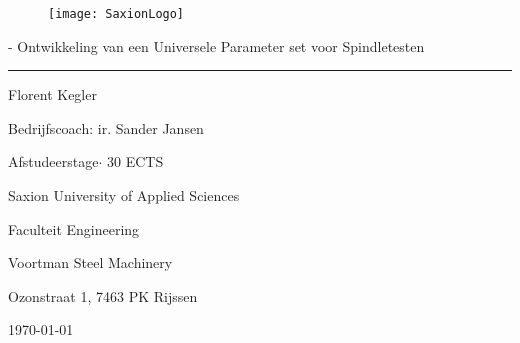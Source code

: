 \newcommand{\thesisAuthor}{Florent Kegler \newline 514277}
\newcommand{\thesisSubTitle}{Ontwikkeling van een Universele Parameter set voor Spindletesten}
\newcommand{\thesisDegree}{Afstudeerstage}
\newcommand{\university}{Saxion University of Applied Sciences}
\newcommand{\credits}{30 ECTS}
\newcommand{\faculty}{Faculteit Engineering}
\newcommand{\thesisPlaceDate}{\today}
\newcommand{\company}{Voortman Steel Machinery}
\newcommand{\address}{Ozonstraat 1, 7463 PK Rijssen}
\newcommand{\bedrijfscoach}{ir. Sander Jansen}

\thispagestyle{empty}
\myfont

\begin{figure}
	\vspace{-3cm}
	\centering
	
	\begin{minipage}[t]{.7\linewidth}
		\vspace{1cm}
		\raggedleft
		\hspace*{1cm}\texttt{[image: SaxionLogo]}\hspace*{-4cm}
	\end{minipage}
\end{figure}


\vspace{3cm}
\par
\noindent
\Huge
\textbf{\thesisTitle}
\vspace{0.2cm}
\small
\par
\noindent
- \thesisSubTitle\\
\rule[0.3cm]{\linewidth}{2pt}
\Large

\noindent

\vspace{4cm}

\noindent
\LARGE
\thesisAuthor\\
\small
\par \noindent
Bedrijfscoach: \bedrijfscoach\\
\vspace{4cm}

\noindent
\makebox[0pt][r]{ %
	\begin{minipage}{0.3cm}
		\rule{0.5pt}{3cm} %
	\end{minipage}
}
\begin{minipage}{0.5\linewidth}
	\par \noindent
	\thesisDegree $\cdot$ \credits
	\par \noindent
	\university
	\par \noindent
	\faculty
	\par \noindent
	\company
	\par \noindent
	\address
	\par \noindent
	\thesisPlaceDate
\end{minipage}



